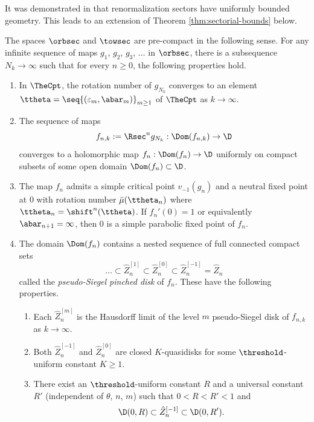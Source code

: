 \documentclass{amsart}
\begin{document}
It was demonstrated in \cite{DLy26a} that renormalization sectors have uniformly bounded geometry.
This leads to an extension of Theorem \ref{thm:sectorial-bounds} below.

\begin{theorem}
\label{thm:renorm-limits}
    The spaces $\orbsec$ and $\towsec$ are pre-compact in the following sense. 
    For any infinite sequence of maps $g_1$, $g_2$, $ g_3$, $\ldots$ in $\orbsec$, there is a subsequence $N_k \to \infty$ such that for every $n \geq 0$, the following properties hold.
    \begin{enumerate}[label = \textnormal{(\arabic*)}]
        \item In $\TheCpt$, the rotation number of $g_{N_k}$ converges to an element $\ttheta = \seq{ (\varepsilon_m, \abar_m) }_{m \geq 1}$ of $\TheCpt$ as $k \to \infty$.
        \item The sequence of maps 
        \[
        f_{n,k} := \Rsec^n g_{N_k}: \Dom(f_{n,k}) \to \D
        \]
        converges to a holomorphic map $f_n : \Dom(f_n) \to \D$ uniformly on compact subsets of some open domain $\Dom(f_n) \subset \D$.
        \item The map $f_n$ admits a simple critical point $v_{-1}(g_n)$ and a neutral fixed point at $0$ with rotation number $\bar{\mu}(\ttheta_n)$ where $\ttheta_n = \shift^n(\ttheta)$. 
        If $f_n'(0) = 1$ or equivalently $\abar_{n+1} = \infty$, then $0$ is a simple parabolic fixed point of $f_n$.
        \item The domain $\Dom(f_n)$ contains a nested sequence of full connected compact sets 
        \[
            \ldots \subset \hat{Z}^{[1]}_n \subset \hat{Z}^{[0]}_n \subset \hat{Z}^{[-1]}_n = \hat{Z}_n
        \]
        called the \emph{pseudo-Siegel pinched disk} of $f_n$. 
        These have the following properties.
        \begin{enumerate}[label = \textnormal{(\alph*)}]
            \item Each $\hat{Z}^{[m]}_n$ is the Hausdorff limit of the level $m$ pseudo-Siegel disk of $f_{n,k}$ as $k \to \infty$.
            \item Both $\hat{Z}^{[-1]}_n$ and $\hat{Z}^{[0]}_n$ are closed $K$-quasidisks for some $\threshold$-uniform constant $K \geq 1$.
            \item There exist an $\threshold$-uniform constant $R$ and a universal constant $R'$ (independent of $\theta$, $n$, $m$) such that $0<R<R'<1$ and
            \[
            \D(0,R) \subset \hat{Z}^{[-1]}_n \subset \D(0,R').
            \]
        \end{enumerate} 


\end{enumerate}
\end{theorem}
\end{document}

